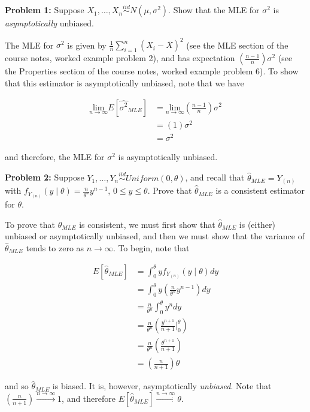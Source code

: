 \documentclass[
  letterpaper,
  DIV=11,
  numbers=noendperiod]{scrreprt}
\begin{document}
\textbf{Problem 1:} Suppose
\(X_1, \dots, X_n \overset{iid}{\sim} N(\mu, \sigma^2)\). Show that the
MLE for \(\sigma^2\) is \emph{asymptotically} unbiased.

The MLE for \(\sigma^2\) is given by
\(\frac{1}{n} \sum_{i = 1}^n (X_i - \overline{X})^2\) (see the MLE
section of the course notes, worked example problem 2), and has
expectation \(\left( \frac{n-1}{n} \right)\sigma^2\) (see the Properties
section of the course notes, worked example problem 6). To show that
this estimator is asymptotically unbiased, note that we have

\begin{align*}
    \underset{n\to \infty}{\text{lim}} E[\hat{\sigma^2}_{MLE}] & = \underset{n\to \infty}{\text{lim}} \left( \frac{n-1}{n} \right) \sigma^2 \\
    & = \left( 1 \right) \sigma^2 \\
    & = \sigma^2
\end{align*}

and therefore, the MLE for \(\sigma^2\) is asymptotically unbiased.

\textbf{Problem 2:} Suppose
\(Y_1, \dots, Y_n \overset{iid}{\sim} Uniform(0, \theta)\), and recall
that \(\hat{\theta}_{MLE} = Y_{(n)}\) with
\(f_{Y_{(n)}}(y \mid \theta) = \frac{n}{\theta^n} y^{n-1}\),
\(0 \leq y \leq \theta\). Prove that \(\hat{\theta}_{MLE}\) is a
consistent estimator for \(\theta\).

To prove that \(\hat{\theta}_{MLE}\) is consistent, we must first show
that \(\hat{\theta}_{MLE}\) is (either) unbiased or asymptotically
unbiased, and then we must show that the variance of
\(\hat{\theta}_{MLE}\) tends to zero as \(n \to \infty\). To begin, note
that

\begin{align*}
    E\left[\hat{\theta}_{MLE}\right] & = \int_{0}^\theta y f_{Y_{(n)}} (y \mid \theta) dy \\
    & = \int_{0}^\theta y \left( \frac{n}{\theta^n} y^{n-1} \right) dy \\
    & = \frac{n}{\theta^n} \int_0^\theta y^n dy \\
    & = \frac{n}{\theta^n} \left( \frac{y^{n + 1}}{n + 1} \bigg|_0^\theta \right) \\
    & = \frac{n}{\theta^n} \left( \frac{\theta^{n + 1}}{n + 1} \right) \\
    & = \left( \frac{n}{n + 1} \right) \theta
\end{align*}

and so \(\hat{\theta}_{MLE}\) is biased. It is, however, asymptotically
\emph{unbiased}. Note that
\(\left( \frac{n}{n + 1} \right) \overset{n \to \infty}{\to} 1\), and
therefore
\(E\left[\hat{\theta}_{MLE}\right] \overset{n \to \infty}{\to} \theta\).
\end{document}
